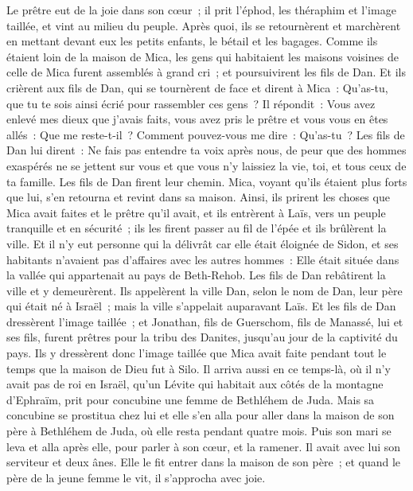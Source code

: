 \begin{multicols}{2}
Le prêtre eut de la joie dans son cœur~; il prit l'éphod, les théraphim et l'image taillée, et vint au milieu du peuple.
Après quoi, ils se retournèrent et marchèrent en mettant devant eux les petits enfants, le bétail et les bagages.
Comme ils étaient loin de la maison de Mica, les gens qui habitaient les maisons voisines de celle de Mica furent assemblés à grand cri~; et poursuivirent les fils de Dan.
Et ils crièrent aux fils de Dan, qui se tournèrent de face et dirent à Mica~: Qu'as-tu, que tu te sois ainsi écrié pour rassembler ces gens~?
Il répondit~: Vous avez enlevé mes dieux que j'avais faits, vous avez pris le prêtre et vous vous en êtes allés~: Que me reste-t-il~? Comment pouvez-vous me dire~: Qu'as-tu~?
Les fils de Dan lui dirent~: Ne fais pas entendre ta voix après nous, de peur que des hommes exaspérés ne se jettent sur vous et que vous n'y laissiez la vie, toi, et tous ceux de ta famille.
Les fils de Dan firent leur chemin. Mica, voyant qu'ils étaient plus forts que lui, s'en retourna et revint dans sa maison.
Ainsi, ils prirent les choses que Mica avait faites et le prêtre qu'il avait, et ils entrèrent à Laïs, vers un peuple tranquille et en sécurité~; ils les firent passer au fil de l'épée et ils brûlèrent la ville.
Et il n'y eut personne qui la délivrât car elle était éloignée de Sidon, et ses habitants n'avaient pas d'affaires avec les autres hommes~: Elle était située dans la vallée qui appartenait au pays de Beth-Rehob. Les fils de Dan rebâtirent la ville et y demeurèrent.
Ils appelèrent la ville Dan, selon le nom de Dan, leur père qui était né à Israël~; mais la ville s'appelait auparavant Laïs.
Et les fils de Dan dressèrent l'image taillée~; et Jonathan, fils de Guerschom, fils de Manassé, lui et ses fils, furent prêtres pour la tribu des Danites, jusqu'au jour de la captivité du pays.
Ils y dressèrent donc l'image taillée que Mica avait faite pendant tout le temps que la maison de Dieu fut à Silo.
\VerseOne{}Il arriva aussi en ce temps-là, où il n'y avait pas de roi en Israël, qu'un Lévite qui habitait aux côtés de la montagne d'Ephraïm, prit pour concubine une femme de Bethléhem de Juda.
Mais sa concubine se prostitua chez lui et elle s'en alla pour aller dans la maison de son père à Bethléhem de Juda, où elle resta pendant quatre mois.
Puis son mari se leva et alla après elle, pour parler à son cœur, et la ramener. Il avait avec lui son serviteur et deux ânes. Elle le fit entrer dans la maison de son père~; et quand le père de la jeune femme le vit, il s'approcha avec joie.

\end{multicols}
